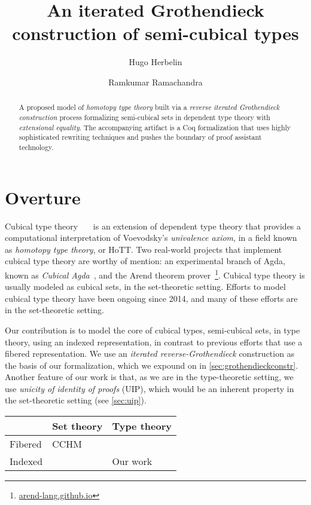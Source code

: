 \documentclass[10pt]{amsart}
\title{An iterated Grothendieck construction of semi-cubical types}
\author{Hugo Herbelin}
\author{Ramkumar Ramachandra}
\theoremstyle{definition}
\numberwithin{definition}{subsection}
\numberwithin{definition}{section}
\begin{document}
\begin{abstract}
  A proposed model of \emph{homotopy type theory} built via a \emph{reverse iterated Grothendieck construction} process formalizing semi-cubical sets in dependent type theory with \emph{extensional equality}. The accompanying artifact is a Coq formalization that uses highly sophisticated rewriting techniques and pushes the boundary of proof assistant technology.
\end{abstract}
\maketitle
\tableofcontents
\newpage

\section{Overture}
Cubical type theory~\cite{Bezem14}~\cite{Cohen16}~\cite{Angiuli17} is an extension of dependent type theory that provides a computational interpretation of Voevodsky's \emph{univalence axiom}, in a field known as \emph{homotopy type theory}, or HoTT. Two real-world projects that implement cubical type theory are worthy of mention: an experimental branch of Agda, known as \emph{Cubical Agda}~\cite{Vezzosi21}, and the Arend theorem prover~\footnote{\href{https://arend-lang.github.io}{arend-lang.github.io}}. Cubical type theory is usually modeled as cubical sets, in the set-theoretic setting. Efforts to model cubical type theory have been ongoing since 2014, and many of these efforts are in the set-theoretic setting.

Our contribution is to model the core of cubical types, semi-cubical sets, in type theory, using an indexed representation, in contrast to previous efforts that use a fibered representation. We use an \emph{iterated reverse-Grothendieck} construction as the basis of our formalization, which we expound on in \ref{sec:grothendieckconstr}. Another feature of our work is that, as we are in the type-theoretic setting, we use \emph{unicity of identity of proofs} (UIP), which would be an inherent property in the set-theoretic setting (see \ref{sec:uip}).

\begin{table}[H]
  \begin{tabularx}{\linewidth}{p{.3\linewidth}|p{.3\linewidth}|p{.3\linewidth}}
    \toprule
            & Set theory & Type theory \\
    \midrule
    Fibered & CCHM       &             \\
    \midrule
    Indexed &            & Our work    \\
    \bottomrule
  \end{tabularx}
\end{table}
\end{document}

